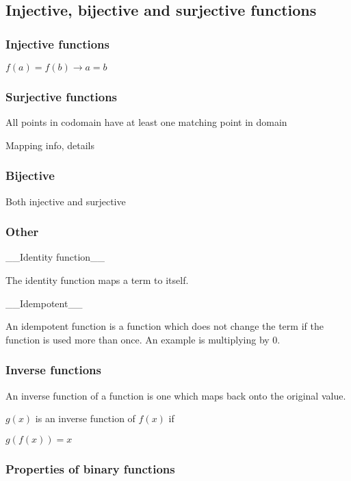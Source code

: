
\subsection{Injective, bijective and surjective functions}

\subsubsection{Injective functions}

\(f(a)=f(b)\rightarrow a=b\)

\subsubsection{Surjective functions}

All points in codomain have at least one matching point in domain

Mapping info, details

\subsubsection{Bijective}

Both injective and surjective

\subsubsection{Other}

__Identity function__

The identity function maps a term to itself.

__Idempotent__

An idempotent function is a function which does not change the term if the function is used more than once. An example is multiplying by \(0\).

\subsubsection{Inverse functions}

An inverse function of a function is one which maps back onto the original value.

\(g(x)\) is an inverse function of \(f(x)\) if	

\(g(f(x))=x\)

\subsubsection{Properties of binary functions}


